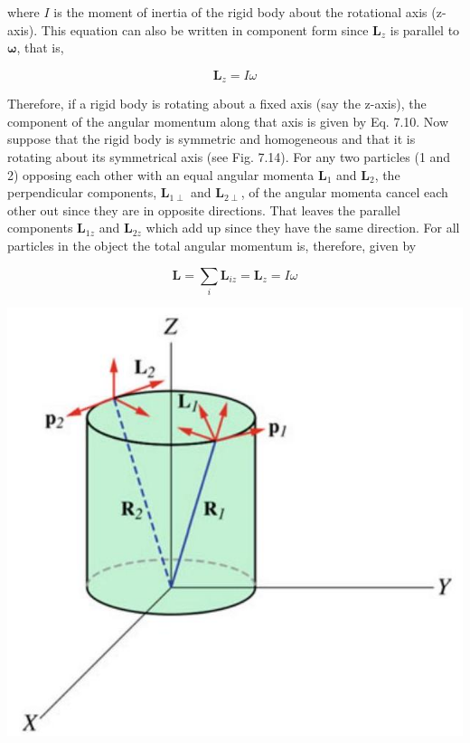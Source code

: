 \documentclass[10pt]{article}
\begin{document}
where $I$ is the moment of inertia of the rigid body about the rotational axis (z-axis). This equation can also be written in component form since $\mathbf{L}_{z}$ is parallel to $\boldsymbol{\omega}$, that is,


\begin{equation*}
\mathbf{L}_{z}=I \omega \tag{7.10}
\end{equation*}


Therefore, if a rigid body is rotating about a fixed axis (say the z-axis), the component of the angular momentum along that axis is given by Eq. 7.10. Now suppose that the rigid body is symmetric and homogeneous and that it is rotating about its symmetrical axis (see Fig. 7.14). For any two particles (1 and 2) opposing each other with an equal angular momenta $\mathbf{L}_{1}$ and $\mathbf{L}_{2}$, the perpendicular components, $\mathbf{L}_{1 \perp}$ and $\mathbf{L}_{2 \perp}$, of the angular momenta cancel each other out since they are in opposite directions. That leaves the parallel components $\mathbf{L}_{1 z}$ and $\mathbf{L}_{2 z}$ which add up since they have the same direction. For all particles in the object the total angular momentum is, therefore, given by

$$
\mathbf{L}=\sum_{i} \mathbf{L}_{i z}=\mathbf{L}_{z}=I \omega
$$

\begin{center}
\includegraphics[max width=\textwidth]{2024_09_13_db1f357d2aad0a03eb2eg-119}
\end{center}
\end{document}
